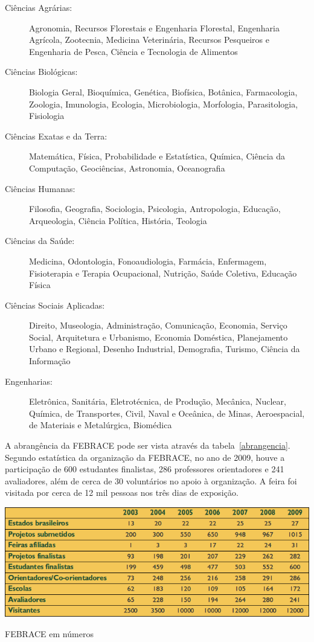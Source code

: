 \begin{description}
    \item[Ciências Agrárias:] 
        Agronomia, Recursos Florestais e Engenharia Florestal, Engenharia Agrícola, Zootecnia, Medicina Veterinária, Recursos Pesqueiros e Engenharia de Pesca, Ciência e Tecnologia de Alimentos
    \item[Ciências Biológicas:] 
        Biologia Geral, Bioquímica, Genética, Biofísica, Botânica, Farmacologia, Zoologia, Imunologia, Ecologia, Microbiologia, Morfologia, Parasitologia, Fisiologia 	 
    \item[Ciências Exatas e da Terra:] 
        Matemática, Física, Probabilidade e Estatística, Química, Ciência da Computação, Geociências, Astronomia, Oceanografia 
    \item[Ciências Humanas:] 
        Filosofia, Geografia, Sociologia, Psicologia, Antropologia, Educação, Arqueologia, Ciência Política, História, Teologia 
    \item[Ciências da Saúde:] 
        Medicina, Odontologia, Fonoaudiologia, Farmácia, Enfermagem, Fisioterapia e Terapia Ocupacional, Nutrição, Saúde Coletiva, Educação Física
    \item[Ciências Sociais Aplicadas:] 
        Direito, Museologia, Administração, Comunicação, Economia, Serviço Social, Arquitetura e Urbanismo, Economia Doméstica, Planejamento Urbano e Regional, Desenho Industrial, Demografia, Turismo, Ciência da Informação  	 
    \item[Engenharias:] 
        Eletrônica, Sanitária, Eletrotécnica, de Produção, Mecânica, Nuclear, Química, de Transportes, Civil, Naval e Oceânica, de Minas, Aeroespacial, de Materiais e Metalúrgica, Biomédica 
\end{description}

 A abrangência da FEBRACE pode ser vista através da tabela~\ref{abrangencia}. Segundo estatística da organização da FEBRACE, no ano de 2009, houve a participação de 600 estudantes finalistas, 286 professores orientadores e 241 avaliadores, além de cerca de 30 voluntários no apoio à organização. A feira foi visitada por cerca de 12 mil pessoas nos três dias de exposição. 

\begin{table}[h]
    \begin{center}
        \includegraphics[width=0.8\linewidth]{arquivos/abrangencia.png}
    \end{center}
    \caption{FEBRACE em números}
    \label{abrangencia}
\end{table}

